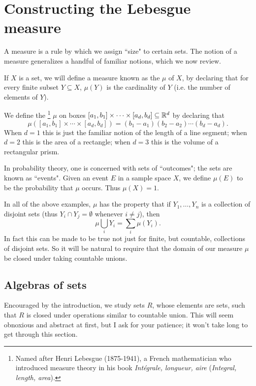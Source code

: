 \chapter{Constructing the Lebesgue measure}
\label{ch:ch1}

\label{measureChapter}
A measure is a rule by which we assign ``size" to certain sets.
The notion of a measure generalizes a handful of familiar notions, which we now review.
\begin{example}
\label{examples of measures}
If $X$ is a set, we will define a measure known as the  $\mu$ of $X$, by declaring that for every finite subset $Y \subseteq X$, $\mu(Y)$ is the cardinality of $Y$ (i.e. the number of elements of $Y$).

We define the \footnote{Named after Henri Lebesgue (1875-1941), a French mathematician who introduced measure theory in his book \emph{Intégrale, longueur, aire} (\emph{Integral, length, area}).}
$\mu$ on boxes $[a_1, b_1] \times \cdots \times [a_d, b_d] \subseteq \mathbb{R}^d$ by declaring that
\[\mu([a_1, b_1] \times \cdots \times [a_d, b_d]) = (b_1 - a_1)(b_2 - a_2)\cdots(b_d - a_d).\]
When $d = 1$ this is just the familiar notion of the length of a line segment; when $d = 2$ this is the area of a rectangle; when $d = 3$ this is the volume of a rectangular prism.

In probability theory, one is concerned with sets of ``outcomes"; the sets are known as ``events". Given an event $E$ in a sample space $X$, we define $\mu(E)$ to be the probability that $\mu$ occurs. Thus $\mu(X) = 1$.
\end{example}

\begin{subsec}
In all of the above examples, $\mu$ has the property that if $Y_1, \dots, Y_n$ is a collection of disjoint sets (thus $Y_i \cap Y_j = \emptyset$ whenever $i \neq j$), then
\[\mu\bigcup_i Y_i = \sum_i \mu(Y_i).\]
In fact this can be made to be true not just for finite, but countable, collections of disjoint sets.
So it will be natural to require that the domain of our measure $\mu$ be closed under taking countable unions.
\end{subsec}

\section{Algebras of sets}
Encouraged by the introduction, we study sets $R$, whose elements are sets, such that $R$ is closed under operations similar to countable union.
This will seem obnoxious and abstract at first, but I ask for your patience; it won't take long to get through this section.

